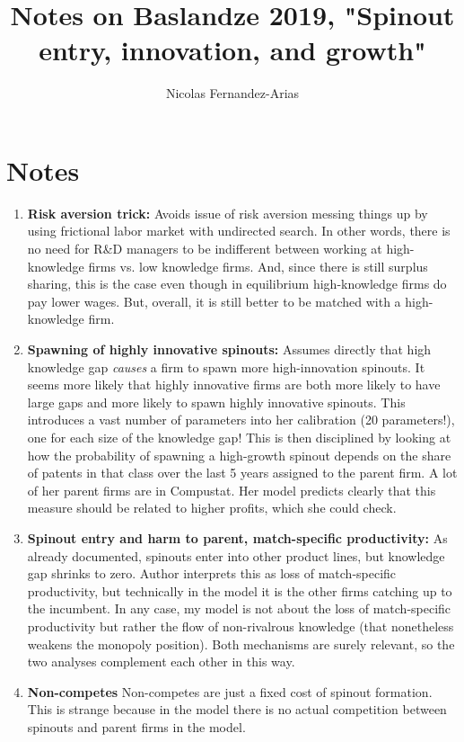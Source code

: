 \documentclass[12pt,english]{article}
\theoremstyle{remark}
\begin{document}
	
\title{Notes on Baslandze 2019, "Spinout entry, innovation, and growth"}
\author{Nicolas Fernandez-Arias}
\maketitle

\section{Notes}

\begin{enumerate}
	\item \textbf{Risk aversion trick:} Avoids issue of risk aversion messing things up by using frictional labor market with undirected search. In other words, there is no need for R\&D managers to be indifferent between working at high-knowledge firms vs. low knowledge firms. And, since there is still surplus sharing, this is the case even though in equilibrium high-knowledge firms do pay lower wages. But, overall, it is still better to be matched with a high-knowledge firm.
	\item \textbf{Spawning of highly innovative spinouts: } Assumes directly that high knowledge gap \textit{causes} a firm to spawn more high-innovation spinouts. It seems more likely that highly innovative firms are both more likely to have large gaps and more likely to spawn highly innovative spinouts. This introduces a vast number of parameters into her calibration (20 parameters!), one for each size of the knowledge gap! This is then disciplined by looking at how the probability of spawning a high-growth spinout depends on the share of patents in that class over the last 5 years assigned to the parent firm. A lot of her parent firms are in Compustat. Her model predicts clearly that this measure should be related to higher profits, which she could check.
	\item \textbf{Spinout entry and harm to parent, match-specific productivity: } As already documented, spinouts enter into other product lines, but knowledge gap shrinks to zero. Author interprets this as loss of match-specific productivity, but technically in the model it is the other firms catching up to the incumbent. In any case, my model is not about the loss of match-specific productivity but rather the flow of non-rivalrous knowledge (that nonetheless weakens the monopoly position). Both mechanisms are surely relevant, so the two analyses complement each other in this way.
	\item \textbf{Non-competes} Non-competes are just a fixed cost of spinout formation. This is strange because in the model there is no actual competition between spinouts and parent firms in the model.

\end{enumerate}
\end{document}
